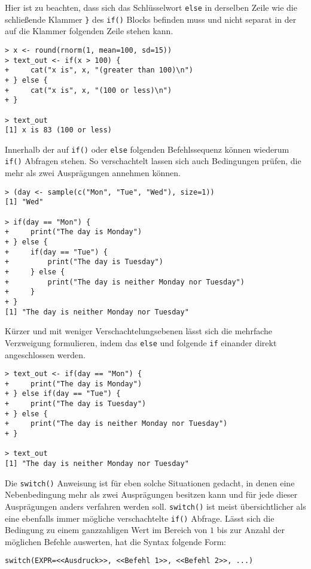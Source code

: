 Hier ist zu beachten, dass sich das Schlüsselwort \lstinline!else! in derselben Zeile wie die schließende Klammer \lstinline!}! des \lstinline!if()! Blocks befinden muss und nicht separat in der auf die Klammer folgenden Zeile stehen kann.
\begin{lstlisting}
> x <- round(rnorm(1, mean=100, sd=15))
> text_out <- if(x > 100) {
+     cat("x is", x, "(greater than 100)\n")
+ } else {
+     cat("x is", x, "(100 or less)\n")
+ }

> text_out
[1] x is 83 (100 or less)
\end{lstlisting}

Innerhalb der auf \lstinline!if()! oder \lstinline!else! folgenden Befehlssequenz können wiederum \lstinline!if()! Abfragen stehen. So verschachtelt lassen sich auch Bedingungen prüfen, die mehr als zwei Ausprägungen annehmen können.
\begin{lstlisting}
> (day <- sample(c("Mon", "Tue", "Wed"), size=1))
[1] "Wed"

> if(day == "Mon") {
+     print("The day is Monday")
+ } else {
+     if(day == "Tue") {
+         print("The day is Tuesday")
+     } else {
+         print("The day is neither Monday nor Tuesday")
+     }
+ }
[1] "The day is neither Monday nor Tuesday"
\end{lstlisting}

Kürzer und mit weniger Verschachtelungsebenen lässt sich die mehrfache Verzweigung formulieren, indem das \lstinline!else! und folgende \lstinline!if! einander direkt angeschlossen werden.
\begin{lstlisting}
> text_out <- if(day == "Mon") {
+     print("The day is Monday")
+ } else if(day == "Tue") {
+     print("The day is Tuesday")
+ } else {
+     print("The day is neither Monday nor Tuesday")
+ }

> text_out
[1] "The day is neither Monday nor Tuesday"
\end{lstlisting}

Die \lstinline!switch()! Anweisung ist für eben solche Situationen gedacht, in denen eine Nebenbedingung mehr als zwei Ausprägungen besitzen kann und für jede dieser Ausprägungen anders verfahren werden soll. \lstinline!switch()! ist meist übersichtlicher als eine ebenfalls immer mögliche verschachtelte \lstinline!if()! Abfrage. Lässt sich die Bedingung zu einem ganzzahligen Wert im Bereich von $1$ bis zur Anzahl der möglichen Befehle auswerten, hat die Syntax folgende Form:
\begin{lstlisting}
switch(EXPR=<<Ausdruck>>, <<Befehl 1>>, <<Befehl 2>>, ...)
\end{lstlisting}

